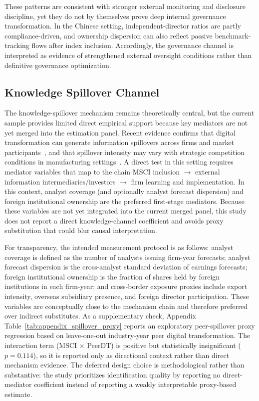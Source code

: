 These patterns are consistent with stronger external monitoring and disclosure discipline, yet they do not by themselves prove deep internal governance transformation. In the Chinese setting, independent-director ratios are partly compliance-driven, and ownership dispersion can also reflect passive benchmark-tracking flows after index inclusion. Accordingly, the governance channel is interpreted as evidence of strengthened external oversight conditions rather than definitive governance optimization.

\subsection{Knowledge Spillover Channel}

The knowledge-spillover mechanism remains theoretically central, but the current sample provides limited direct empirical support because key mediators are not yet merged into the estimation panel. Recent evidence confirms that digital transformation can generate information spillovers across firms and market participants~\cite{WangWang2026}, and that spillover intensity may vary with strategic competition conditions in manufacturing settings~\cite{LiuGu2026}. A direct test in this setting requires mediator variables that map to the chain MSCI inclusion $\to$ external information intermediaries/investors $\to$ firm learning and implementation. In this context, analyst coverage (and optionally analyst forecast dispersion) and foreign institutional ownership are the preferred first-stage mediators. Because these variables are not yet integrated into the current merged panel, this study does not report a direct knowledge-channel coefficient and avoids proxy substitution that could blur causal interpretation.

For transparency, the intended measurement protocol is as follows: analyst coverage is defined as the number of analysts issuing firm-year forecasts; analyst forecast dispersion is the cross-analyst standard deviation of earnings forecasts; foreign institutional ownership is the fraction of shares held by foreign institutions in each firm-year; and cross-border exposure proxies include export intensity, overseas subsidiary presence, and foreign director participation. These variables are conceptually close to the mechanism chain and therefore preferred over indirect substitutes. As a supplementary check, Appendix Table~\ref{tab:appendix_spillover_proxy} reports an exploratory peer-spillover proxy regression based on leave-one-out industry-year peer digital transformation. The interaction term (MSCI $\times$ PeerDT) is positive but statistically insignificant ($p = 0.114$), so it is reported only as directional context rather than direct mechanism evidence. The deferred design choice is methodological rather than substantive: the study prioritizes identification quality by reporting no direct-mediator coefficient instead of reporting a weakly interpretable proxy-based estimate.

